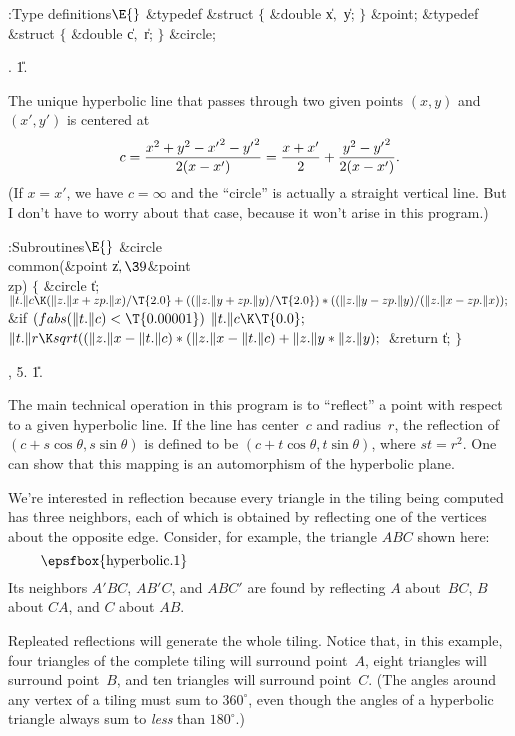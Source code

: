 \Y\B\4:Type definitions\X${}\E{}$\6
\&{typedef} \&{struct} ${}\{{}$\5
\1\&{double} \|x${},{}$ \|y;\5
\2${}\}{}$\5
\&{point};\6
\&{typedef} \&{struct} ${}\{{}$\5
\1\&{double} \|c${},{}$ \|r;\5
\2${}\}{}$\5
\&{circle};\par
{}.
\U1.\fi

The unique hyperbolic line that passes through two given
points
$(x,y)$ and $(x',y')$ is centered at
$$c={x^2+y^2-{x'}^2-{y'}^2\over 2(x-x')}
={x+x'\over2}+{y^2-{y'}^2\over2(x-x')}.$$
(If $x=x'$, we have $c=\infty$ and the ``circle'' is actually a
straight vertical line. But I don't have to worry about that case,
because it won't arise in this program.)

\Y\B\4:Subroutines\X${}\E{}$\6
\&{circle} \\{common}(\&{point} \|z${},\39{}$\&{point} \\{zp})\1\1\2\2\6
${}\{{}$\1\6
\&{circle} \|t;\7
${}\|t.\|c\K(\|z.\|x+\\{zp}.\|x)/\T{2.0}+((\|z.\|y+\\{zp}.\|y)/\T{2.0})*((\|z.%
\|y-\\{zp}.\|y)/(\|z.\|x-\\{zp}.\|x));{}$\6
\&{if} ${}(\\{fabs}(\|t.\|c)<\T{0.00001}){}$\1\5
${}\|t.\|c\K\T{0.0};{}$\2\6
${}\|t.\|r\K\\{sqrt}((\|z.\|x-\|t.\|c)*(\|z.\|x-\|t.\|c)+\|z.\|y*\|z.\|y);{}$\6
\&{return} \|t;\6
\4${}\}{}$\2\par
{}, 5.
\U1.\fi

The main technical operation in this program is to
``reflect'' a point with respect to a given hyperbolic line.
If the line has center~$c$ and radius~$r$, the reflection
of $(c+s\cos\theta,s\sin\theta)$ is defined to be
$(c+t\cos\theta,t\sin\theta)$, where $st=r^2$. One can show
that this mapping is an automorphism of the hyperbolic plane.

We're interested in reflection because every triangle in the
tiling being computed has three neighbors, each of which is
obtained by reflecting one of the vertices about the
opposite edge. Consider, for example, the triangle $ABC$
shown here:
$$\vcenter{\epsfbox{hyperbolic.1}}$$
Its neighbors $A'BC$, $AB'C$, and $ABC'$ are found by
reflecting $A$ about~$BC$, $B$ about $C\!A$, and $C$ about $AB$.

Repleated reflections will generate the whole tiling. Notice that,
in this example, four triangles of the complete tiling will surround
point~$A$, eight triangles will surround point~$B$, and
ten triangles will surround point~$C$. (The angles around any vertex
of a tiling must sum to $360^\circ$, even though the
angles of a hyperbolic triangle always sum to {\it less\/} than
$180^\circ$.)

